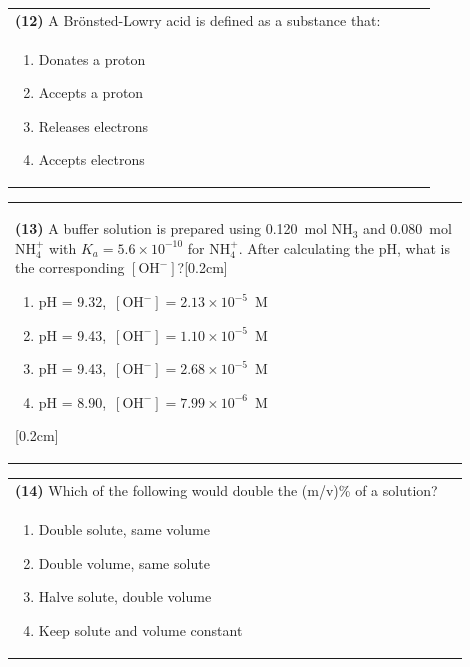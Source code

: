 \documentclass{article}
\begin{document}
\noindent\begin{tabular}{|p{0.9\linewidth}|}
\hline
\textbf{(12)} A Brönsted-Lowry acid is defined as a substance that: \\[0.2cm]
\begin{minipage}[t]{0.85\linewidth}
\begin{enumerate}[label=\alph*.]
\item Donates a proton
\item Accepts a proton
\item Releases electrons
\item Accepts electrons
\end{enumerate}
\end{minipage}\\[0.2cm]
\hline
\end{tabular}

\noindent\begin{tabular}{|p{0.9\linewidth}|}
\hline
\textbf{(13)} A buffer solution is prepared using 0.120~mol NH$_3$ and 0.080~mol NH$_4^+$ with $K_a=5.6\times10^{-10}$ for NH$_4^+$. After calculating the pH, what is the corresponding $[\mathrm{OH^-}]$?[0.2cm]
\begin{minipage}[t]{0.85\linewidth}
\begin{enumerate}[label=\alph*.]
\item pH = 9.32,\ $[\mathrm{OH^-}] = 2.13\times10^{-5}$~M
\item pH = 9.43,\ $[\mathrm{OH^-}] = 1.10\times10^{-5}$~M
\item pH = 9.43,\ $[\mathrm{OH^-}] = 2.68\times10^{-5}$~M
\item pH = 8.90,\ $[\mathrm{OH^-}] = 7.99\times10^{-6}$~M
\end{enumerate}
\end{minipage}[0.2cm]
\hline
\end{tabular}


\noindent\begin{tabular}{|p{0.9\linewidth}|}
\hline
\textbf{(14)} Which of the following would double the (m/v)\% of a solution?\\[0.2cm]
\begin{minipage}[t]{0.85\linewidth}
\begin{enumerate}[label=\alph*.]
\item Double solute, same volume
\item Double volume, same solute
\item Halve solute, double volume
\item Keep solute and volume constant
\end{enumerate}
\end{minipage}\\[0.2cm]
\hline
\end{tabular}
\end{document}
